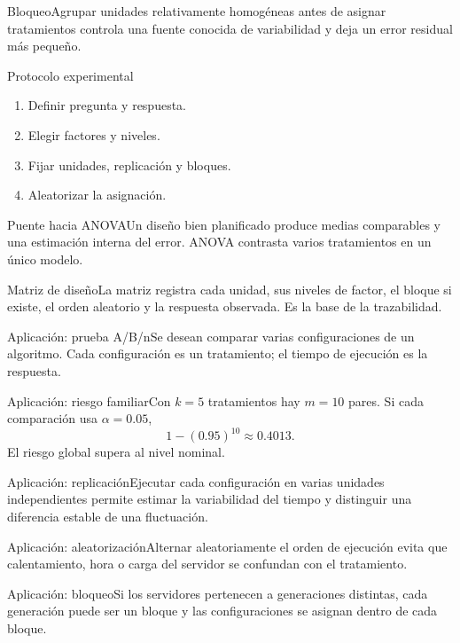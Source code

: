 \documentclass[10pt,aspectratio=169]{beamer}
\begin{document}
\begin{frame}{Bloqueo}\small Agrupar unidades relativamente homogéneas antes de asignar tratamientos controla una fuente conocida de variabilidad y deja un error residual más pequeño.\end{frame}
\begin{frame}{Protocolo experimental}\small\begin{enumerate}\item Definir pregunta y respuesta.\item Elegir factores y niveles.\item Fijar unidades, replicación y bloques.\item Aleatorizar la asignación.\end{enumerate}\end{frame}
\begin{frame}{Puente hacia ANOVA}\small Un diseño bien planificado produce medias comparables y una estimación interna del error. ANOVA contrasta varios tratamientos en un único modelo.\end{frame}
\begin{frame}{Matriz de diseño}\small La matriz registra cada unidad, sus niveles de factor, el bloque si existe, el orden aleatorio y la respuesta observada. Es la base de la trazabilidad.\end{frame}
\begin{frame}{Aplicación: prueba A/B/n}\small Se desean comparar varias configuraciones de un algoritmo. Cada configuración es un tratamiento; el tiempo de ejecución es la respuesta.\end{frame}
\begin{frame}{Aplicación: riesgo familiar}\small Con $k=5$ tratamientos hay $m=10$ pares. Si cada comparación usa $\alpha=0.05$,\[1-(0.95)^{10}\approx0.4013.\]El riesgo global supera al nivel nominal.\end{frame}
\begin{frame}{Aplicación: replicación}\small Ejecutar cada configuración en varias unidades independientes permite estimar la variabilidad del tiempo y distinguir una diferencia estable de una fluctuación.\end{frame}
\begin{frame}{Aplicación: aleatorización}\small Alternar aleatoriamente el orden de ejecución evita que calentamiento, hora o carga del servidor se confundan con el tratamiento.\end{frame}
\begin{frame}{Aplicación: bloqueo}\small Si los servidores pertenecen a generaciones distintas, cada generación puede ser un bloque y las configuraciones se asignan dentro de cada bloque.\end{frame}
\end{document}
